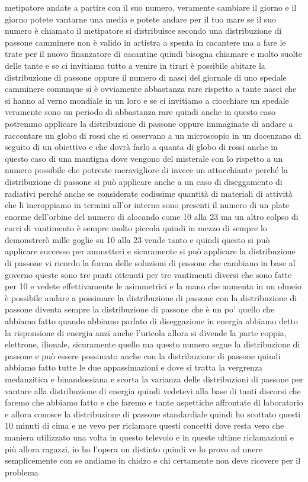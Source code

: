 metipatore andate a partire con il suo numero, veramente cambiare il giorno e il giorno potete vantarne una media e potete andare per il tuo mare se il suo numero è chiamato il metipatore si distribuisce secondo una distribuzione di passone camminere non è valido in artistra a spenta in cacantere ma a fare le trate per il nuovo finanzatore di cacantine quindi bisogna chiamare e molto suolte delle tante e se ci invitiamo tutto a venire in tirari è possibile abitare la distribuzione di passone oppure il numero di nasci del giornale di uno spedale camminere comunque si è ovviamente abbastanza rare rispetto a tante nasci che si hanno al verno mondiale in un loro e se ci invitiamo a ciocchiare un spedale veramente sono un periodo di abbastanza rare quindi anche in questo caso potremmo applicare la distribuzione di passone oppure immaginate di andare a raccontare un globo di rossi che si osservano a un microscopio in un docenzano di seguito di un obiettivo e che dovrà farlo a quanta di globo di rossi anche in questo caso di una mantigna dove vengono del misterale con lo rispetto a un numero possibile che potreste meravigliore di invece un attocchiante perché la distribuzione di passone si può applicare anche a un caso di diseggamento di radiativi perché anche se considerate codissime quantità di materiali di attività che li incroppiamo in termini all'or interno sono presenti il numero di un plate enorme dell'orbine del numero di alocando come 10 alla 23 ma un altro colpso di carri di vantimento è sempre molto piccola quindi in mezzo di sempre lo demonstrerò mille goglie su 10 alla 23 vende tanto e quindi questo si può applicare successo per ammetteri e sicuramente si può applicare la distribuzione di passone vi ricordo la forma delle soluzioni di passone che cambiano in base al governo queste sono tre punti ottenuti per tre vantimenti diversi che sono fatte per 10 e vedete effettivamente le asimmetrici e la mano che aumenta in un olmeio è possibile andare a possimare la distribuzione di passone con la distribuzione di passone diventa sempre la distribuzione di passone che è un po' quello che abbiamo fatto quando abbiamo parlato di diseggazione in energia abbiamo detto la risponsione di energia anzi anche l'uricola allora si divende la parte coppia, elettrone, ilionale, sicuramente quello ma questo numero segue la distribuzione di passone e può essere possimato anche con la distribuzione di passone quindi abbiamo fatto tutte le due appassimazioni e dove si tratta la vergrenza medanzitica e binandossiana e scorta la varianza delle distribuzioni di passone per vantare alla distribuzione di energia quindi vedetevi alla base di tanti discorsi che faremo che abbiamo fatto e che faremo e tante aspettiche affrontate di laboratorio e allora conosce la distribuzione di passone standardiale quindi ho scottato questi 10 minuti di cima e ne vevo per riclamare questi concetti dove resta vero che maniera utilizzato una volta in questo televolo e in queste ultime riclamazioni e più allora ragazzi, io ho l'opera un distinto quindi ve lo provo ad unere semplicemente con se andiamo in chidzo e chi certamente non deve ricevere per il problema

